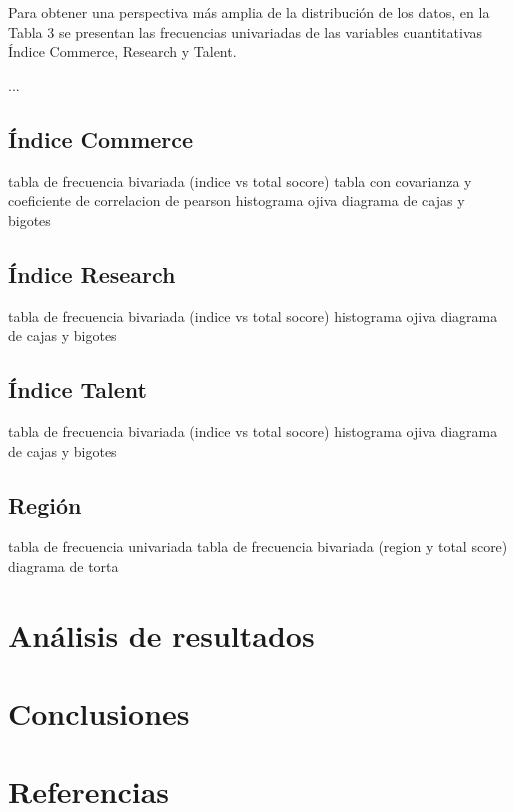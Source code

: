 \documentclass[
]{article}
\begin{document}
\begin{multicols}{2}

Para obtener una perspectiva más amplia de la distribución de los datos, en la Tabla 3 se presentan las frecuencias univariadas de las variables cuantitativas Índice Commerce, Research y Talent. 

...

\subsection{Índice Commerce}
tabla de frecuencia bivariada (indice vs total socore)
tabla con covarianza y coeficiente de correlacion de pearson
histograma
ojiva
diagrama de cajas y bigotes


\subsection{Índice Research}
tabla de frecuencia bivariada (indice vs total socore)
histograma
ojiva
diagrama de cajas y bigotes

\subsection{Índice Talent}
tabla de frecuencia bivariada (indice vs total socore)
histograma
ojiva
diagrama de cajas y bigotes

\subsection{Región}
tabla de frecuencia univariada
tabla de frecuencia bivariada (region y total score)
diagrama de torta

\section{Análisis de resultados}

\section{Conclusiones}
\section{Referencias}

\end{multicols}
\end{document}
